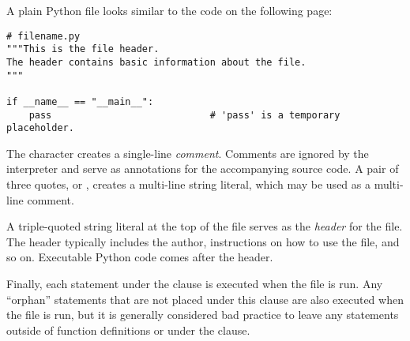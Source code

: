A plain Python file looks similar to the code on the following page:

\begin{lstlisting}
# filename.py
"""This is the file header.
The header contains basic information about the file.
"""

if __name__ == "__main__":
    pass                            # 'pass' is a temporary placeholder.
\end{lstlisting}

The \li{#} character creates a single-line \emph{comment}.
Comments are ignored by the interpreter and serve as annotations for the accompanying source code.
A pair of three quotes,  or , creates a multi-line string literal, which may be used as a multi-line comment.

A triple-quoted string literal at the top of the file serves as the \emph{header} for the file.
The header typically includes the author, instructions on how to use the file, and so on.
Executable Python code comes after the header.

Finally, each statement under the  clause is executed when the file is run.
Any ``orphan'' statements that are not placed under this clause are also executed when the file is run, but it is generally considered bad practice to leave any statements outside of function definitions or under the clause.

